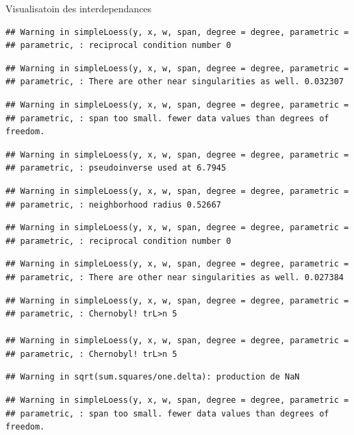 \documentclass[11pt,ignorenonframetext,]{beamer}
\begin{document}
\begin{frame}[fragile]{Visualisatoin des interdependances}
\begin{verbatim}
## Warning in simpleLoess(y, x, w, span, degree = degree, parametric =
## parametric, : reciprocal condition number 0
\end{verbatim}

\begin{verbatim}
## Warning in simpleLoess(y, x, w, span, degree = degree, parametric =
## parametric, : There are other near singularities as well. 0.032307
\end{verbatim}

\begin{verbatim}
## Warning in simpleLoess(y, x, w, span, degree = degree, parametric =
## parametric, : span too small. fewer data values than degrees of freedom.
\end{verbatim}

\begin{verbatim}
## Warning in simpleLoess(y, x, w, span, degree = degree, parametric =
## parametric, : pseudoinverse used at 6.7945
\end{verbatim}

\begin{verbatim}
## Warning in simpleLoess(y, x, w, span, degree = degree, parametric =
## parametric, : neighborhood radius 0.52667
\end{verbatim}

\begin{verbatim}
## Warning in simpleLoess(y, x, w, span, degree = degree, parametric =
## parametric, : reciprocal condition number 0
\end{verbatim}

\begin{verbatim}
## Warning in simpleLoess(y, x, w, span, degree = degree, parametric =
## parametric, : There are other near singularities as well. 0.027384
\end{verbatim}

\begin{verbatim}
## Warning in simpleLoess(y, x, w, span, degree = degree, parametric =
## parametric, : Chernobyl! trL>n 5

## Warning in simpleLoess(y, x, w, span, degree = degree, parametric =
## parametric, : Chernobyl! trL>n 5
\end{verbatim}

\begin{verbatim}
## Warning in sqrt(sum.squares/one.delta): production de NaN
\end{verbatim}

\begin{verbatim}
## Warning in simpleLoess(y, x, w, span, degree = degree, parametric =
## parametric, : span too small. fewer data values than degrees of freedom.
\end{verbatim}


\end{frame}
\end{document}
